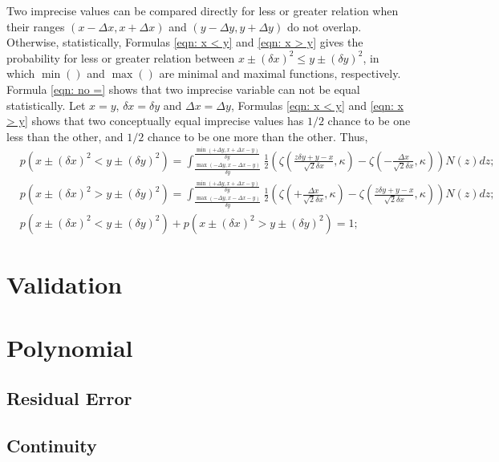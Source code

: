 \documentclass[twoside]{article}
\numberwithin{equation}{section}
\begin{document}
Two imprecise values can be compared directly for less or greater relation when their ranges $(x - \Delta x, x + \Delta x)$ and $(y - \Delta y, y + \Delta y)$ do not overlap. 
Otherwise, statistically, Formulas \eqref{eqn: x < y} and \eqref{eqn: x > y} gives the probability for less or greater relation between $x \pm (\delta x)^2 \le y \pm (\delta y)^2$, in which $\min()$ and $\max()$ are minimal and maximal functions, respectively.
Formula \eqref{eqn: no =} shows that two imprecise variable can not be equal statistically.
Let $x = y$, $\delta x = \delta y$ and $\Delta x = \Delta y$, Formulas \eqref{eqn: x < y} and \eqref{eqn: x > y} shows that two conceptually equal imprecise values has $1/2$ chance to be one less than the other, and $1/2$ chance to be one more than the other.
Thus,
\begin{align}
\label{eqn: x < y}
& p\left( x \pm (\delta x)^2 < y \pm (\delta y)^2 \right) = 
  \int_{\frac{\max(-\Delta y, x - \Delta x - y)}{\delta y}}^{\frac{\min(+\Delta y, x + \Delta x - y)}{\delta y}} 
      \frac{1}{2} \left(\zeta(\frac{z \delta y + y - x}{\sqrt{2} \delta x}, \kappa) - \zeta(-\frac{\Delta x}{\sqrt{2} \delta x}, \kappa)\right) N(z) d z; \\
\label{eqn: x > y}
& p\left( x \pm (\delta x)^2 > y \pm (\delta y)^2 \right) =     
  \int_{\frac{\max(-\Delta y, x - \Delta x - y)}{\delta y}}^{\frac{\min(+\Delta y, x + \Delta x - y)}{\delta y}} 
      \frac{1}{2} \left(\zeta(+\frac{\Delta x}{\sqrt{2} \delta x}, \kappa) - \zeta(\frac{z \delta y + y - x}{\sqrt{2} \delta x}, \kappa)\right) N(z) d z; \\
\label{eqn: no =}
& p\left( x \pm (\delta x)^2 < y \pm (\delta y)^2 \right) + p\left( x \pm (\delta x)^2 > y \pm (\delta y)^2 \right) = 1;
\end{align}


\section{Validation}

\section{Polynomial}

\subsection{Residual Error}

\subsection{Continuity}
\end{document}
